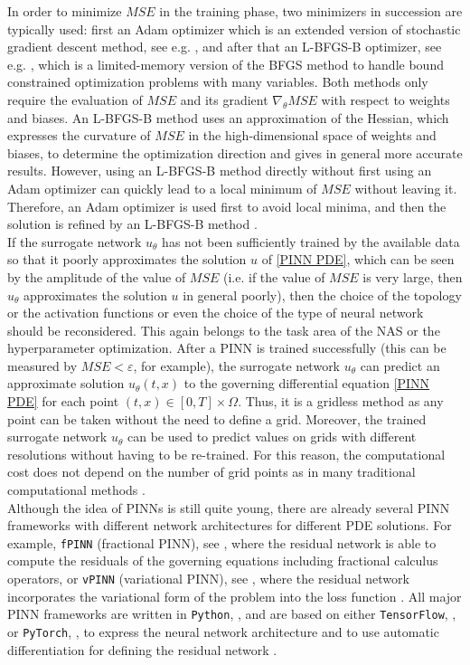 In order to minimize $MSE$ in the training phase, two minimizers in succession are typically used: first an Adam optimizer which is an extended version of stochastic gradient descent method, see e.g. \cite{KingmaBa:2017}, and after that an L-BFGS-B optimizer, see e.g. \cite{ByrdLuNocedalZhu:1995}, which is a limited-memory version of the BFGS method to handle bound constrained optimization problems with many variables. Both methods only require the evaluation of $MSE$ and its gradient $\nabla_\theta MSE$ with respect to weights and biases. An L-BFGS-B method uses an approximation of the Hessian, which expresses the curvature of $MSE$ in the high-dimensional space of weights and biases, to determine the optimization direction and gives in general more accurate results. However, using an L-BFGS-B method directly without first using an Adam optimizer can quickly lead to a local minimum of $MSE$ without leaving it. Therefore, an Adam optimizer is used first to avoid local minima, and then the solution is refined by an L-BFGS-B method \cite[p.~6]{Markidis:2021}. \\
If the surrogate network $u_\theta$ has not been sufficiently trained by the available data so that it poorly approximates the solution $u$ of \cref{PINN PDE}, which can be seen by the amplitude of the value of $MSE$ (i.e. if the value of $MSE$ is very large, then $u_\theta$ approximates the solution $u$ in general poorly), then the choice of the topology or the activation functions or even the choice of the type of neural network should be reconsidered. This again belongs to the task area of the NAS or the hyperparameter optimization. After a PINN is trained successfully (this can be measured by $MSE < \varepsilon$, for example), the surrogate network $u_\theta$ can predict an approximate solution $u_\theta (t,x)$ to the governing differential equation \cref{PINN PDE} for each point $(t,x) \in \left[ 0, T \right] \times \Omega$. Thus, it is a gridless method as any point can be taken without the need to define a grid. Moreover, the trained surrogate network $u_\theta$ can be used to predict values on grids with different resolutions without having to be re-trained. For this reason, the computational cost does not depend on the number of grid points as in many traditional computational methods \cite[p.~2]{Markidis:2021}. \\
Although the idea of PINNs is still quite young, there are already several PINN frameworks with different network architectures for different PDE solutions. For example, \lstinline!fPINN! (fractional PINN), see \cite{PangLuKarniadakis:2019}, where the residual network is able to compute the residuals of the governing equations including fractional calculus operators, or \lstinline!vPINN! (variational PINN), see \cite{KharazmiZhangKarniadakis:2019}, where the residual network incorporates the variational form of the problem into the loss function \cite[pp.~5-6]{Markidis:2021}. All major PINN frameworks are written in \lstinline!Python!, \cite{Python}, and are based on either \lstinline!TensorFlow!, \cite{TensorFlow}, or \lstinline!PyTorch!, \cite{PyTorch}, to express the neural network architecture and to use automatic differentiation for defining the residual network \cite[p.~6]{Markidis:2021}. 


